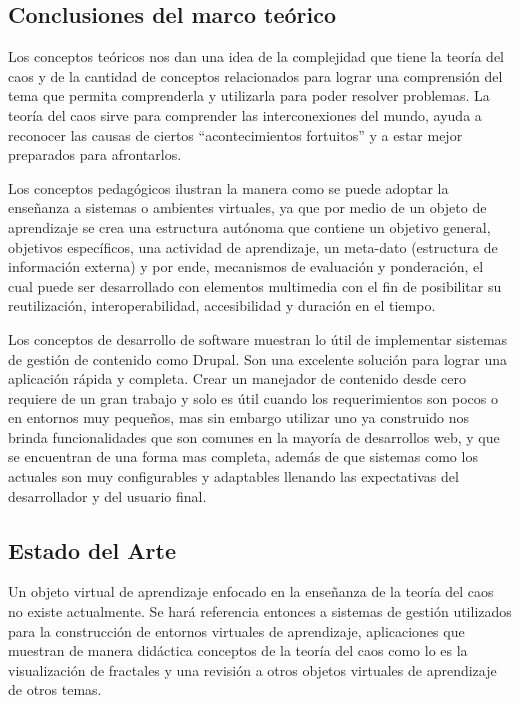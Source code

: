 \documentclass[letterpaper, 11pt, oneside]{article}
\theoremstyle{definition}
\theoremstyle{remark}
\begin{document}
\subsection{Conclusiones del marco teórico}

Los conceptos teóricos nos dan una idea de la complejidad que tiene la teoría del caos y de la cantidad de conceptos relacionados para lograr una comprensión del tema que permita comprenderla y utilizarla para poder resolver problemas. La teoría del caos sirve para comprender las interconexiones del mundo, ayuda a reconocer las causas de ciertos ``acontecimientos fortuitos'' y a estar mejor preparados para afrontarlos.

Los conceptos pedagógicos ilustran la manera como se puede adoptar la enseñanza a sistemas o ambientes virtuales, ya que por medio de un objeto de aprendizaje se crea una estructura autónoma que contiene un objetivo general, objetivos específicos, una actividad de aprendizaje, un meta-dato (estructura de información externa) y por ende, mecanismos de evaluación y ponderación, el cual puede ser desarrollado con elementos multimedia con el fin de posibilitar su reutilización, interoperabilidad, accesibilidad y duración en el tiempo.

Los conceptos de desarrollo de software muestran lo útil de implementar sistemas de gestión de contenido como Drupal. Son una excelente solución para lograr una aplicación rápida y completa. Crear un manejador de contenido desde cero requiere de un gran trabajo y solo es útil cuando los requerimientos son pocos o en entornos muy pequeños, mas sin embargo utilizar uno ya construido nos brinda funcionalidades que son comunes en la mayoría de desarrollos web, y que se encuentran de una forma mas completa, además de que sistemas como los actuales son muy configurables y adaptables llenando las expectativas del desarrollador y del usuario final.

\clearpage
\begin{center}
 \section{Estado del Arte}
\end{center}

Un objeto virtual de aprendizaje enfocado en la enseñanza de la teoría del caos no existe actualmente. Se hará referencia entonces a sistemas de gestión utilizados para la construcción de entornos virtuales de aprendizaje, aplicaciones que muestran de manera didáctica conceptos de la teoría del caos como lo es la visualización de fractales y una revisión a otros objetos virtuales de aprendizaje de otros temas.
\end{document}
